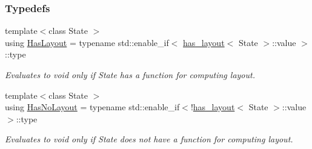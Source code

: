 \subsubsection*{Typedefs}
\begin{DoxyCompactItemize}
\item 
{\footnotesize template$<$class State $>$ }\\using \hyperlink{group__LayoutTraits_ga9bf16cc2a70201a2d10994dbffbe094f}{Has\+Layout} = typename std\+::enable\+\_\+if$<$ \hyperlink{structslb_1_1core_1_1ui_1_1has__layout}{has\+\_\+layout}$<$ State $>$\+::value $>$\+::type
\begin{DoxyCompactList}\small\item\em Evaluates to {\ttfamily void} only if {\ttfamily State} has a function for computing layout. \end{DoxyCompactList}\item 
{\footnotesize template$<$class State $>$ }\\using \hyperlink{group__LayoutTraits_gaf200efa9fbb401dd541fa80e687e0264}{Has\+No\+Layout} = typename std\+::enable\+\_\+if$<$!\hyperlink{structslb_1_1core_1_1ui_1_1has__layout}{has\+\_\+layout}$<$ State $>$\+::value $>$\+::type
\begin{DoxyCompactList}\small\item\em Evaluates to {\ttfamily void} only if {\ttfamily State} does not have a function for computing layout. \end{DoxyCompactList}\end{DoxyCompactItemize}

